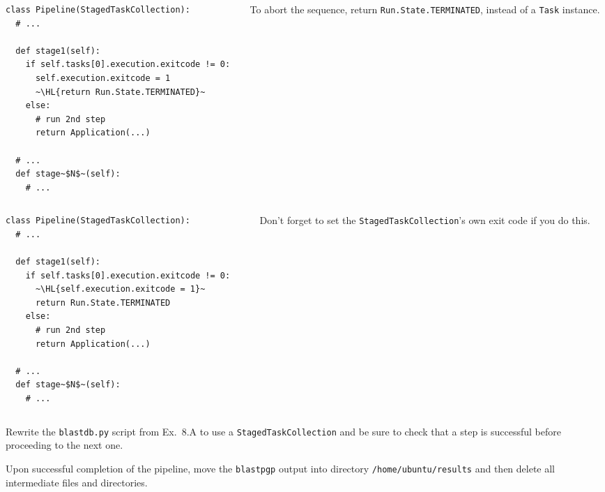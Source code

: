 \documentclass[english,serif,mathserif,xcolor=pdftex,dvipsnames,table]{beamer}
\begin{document}
\begin{frame}[fragile]
  \begin{columns}[c]
    \begin{column}{0.6\textwidth}
      \begin{lstlisting}
class Pipeline(StagedTaskCollection):
  # ...

  def stage1(self):
    if self.tasks[0].execution.exitcode != 0:
      self.execution.exitcode = 1
      ~\HL{return Run.State.TERMINATED}~
    else:
      # run 2nd step
      return Application(...)

  # ...
  def stage~$N$~(self):
    # ...
      \end{lstlisting}
    \end{column}
    \begin{column}{0.4\textwidth}
      \raggedleft

      \+\+\+\+\+
      To abort the sequence, return \texttt{Run.State.TERMINATED},
      instead of a \texttt{Task} instance.
    \end{column}
  \end{columns}
\end{frame}


\begin{frame}[fragile]
  \begin{columns}[c]
    \begin{column}{0.6\textwidth}
      \begin{lstlisting}
class Pipeline(StagedTaskCollection):
  # ...

  def stage1(self):
    if self.tasks[0].execution.exitcode != 0:
      ~\HL{self.execution.exitcode = 1}~
      return Run.State.TERMINATED
    else:
      # run 2nd step
      return Application(...)

  # ...
  def stage~$N$~(self):
    # ...
      \end{lstlisting}
    \end{column}
    \begin{column}{0.4\textwidth}
      \raggedleft

      \+\+\+\+\+
      Don't forget to set the \texttt{StagedTaskCollection}'s own exit
      code if you do this.
    \end{column}
  \end{columns}
\end{frame}


\begin{frame}
  \begin{exercise*}[8.C]
    Rewrite the \texttt{blastdb.py} script from Ex.~8.A to use a
    \texttt{StagedTaskCollection} and be sure to check that a step is
    successful before proceeding to the next one.

    \+
    Upon successful completion of the pipeline, move the
    \texttt{blastpgp} output into directory
    \texttt{/home/ubuntu/results} and then delete all intermediate
    files and directories.
  \end{exercise*}
\end{frame}
\end{document}
